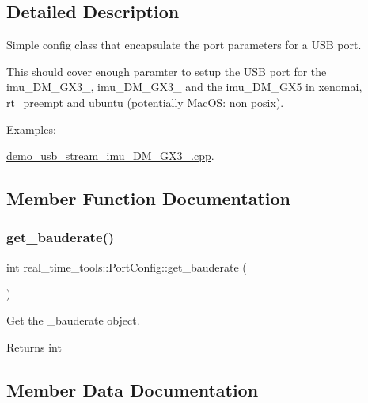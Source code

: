 \subsection{Detailed Description}
Simple config class that encapsulate the port parameters for a U\+SB port. 

This should cover enough paramter to setup the U\+SB port for the imu\+\_\+D\+M\+\_\+\+G\+X3\+\_, imu\+\_\+D\+M\+\_\+\+G\+X3\+\_ and the imu\+\_\+D\+M\+\_\+\+G\+X5 in xenomai, rt\+\_\+preempt and ubuntu (potentially Mac\+OS\+: non posix). \begin{Desc}
\item[Examples\+: ]\par
\hyperlink{demo_usb_stream_imu_3DM_GX3_25_8cpp-example}{demo\+\_\+usb\+\_\+stream\+\_\+imu\+\_\+D\+M\+\_\+\+G\+X3\+\_.\+cpp}.\end{Desc}


\subsection{Member Function Documentation}
\mbox{\label{classreal__time__tools_1_1PortConfig_a9dc2941d278825ecc20a5f260a7fb076}} 
\subsubsection{\texorpdfstring{get\+\_\+bauderate()}{get\_bauderate()}}
{\footnotesize\ttfamily int real\+\_\+time\+\_\+tools\+::\+Port\+Config\+::get\+\_\+bauderate (\begin{DoxyParamCaption}{ }\end{DoxyParamCaption})}



Get the \+\_\+bauderate object. 

\begin{DoxyReturn}{Returns}
int 
\end{DoxyReturn}


\subsection{Member Data Documentation}
\mbox{\label{classreal__time__tools_1_1PortConfig_aa0be2d74f3ac70e9f43d36fc0c70901a}} 

